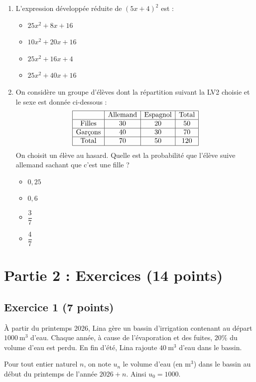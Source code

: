 \documentclass[a4paper,12pt]{article}
\begin{document}
\begin{enumerate}
\item L'expression développée réduite de \((5x+4)^2\) est :
\begin{itemize}
\item[A.] \(25x^2 + 8x + 16\)
\item[B.] \(10x^2 + 20x + 16\)
\item[C.] \(25x^2 + 16x + 4\)
\item[D.] \(25x^2 + 40x + 16\)
\end{itemize}

\item On considère un groupe d'élèves dont la répartition suivant la LV2 choisie et le sexe est donnée ci-dessous :
\[
\begin{array}{|c|c|c|c|}
\hline
& \text{Allemand} & \text{Espagnol} & \text{Total} \\
\hline
\text{Filles} & 30 & 20 & 50 \\
\hline
\text{Garçons} & 40 & 30 & 70 \\
\hline
\text{Total} & 70 & 50 & 120 \\
\hline
\end{array}
\]
On choisit un élève au hasard. Quelle est la probabilité que l'élève suive allemand sachant que c'est une fille ?
\begin{itemize}
\item[A.] \(0{,}25\)
\item[B.] \(0{,}6\)
\item[C.] \(\dfrac{3}{7}\)
\item[D.] \(\dfrac{4}{7}\)
\end{itemize}

\end{enumerate}

\section*{Partie 2 : Exercices (14 points)}

\subsection*{Exercice 1 (7 points)}
À partir du printemps 2026, Lina gère un bassin d'irrigation contenant au départ \(1000\ \mathrm{m}^3\) d'eau. Chaque année, à cause de l'évaporation et des fuites, \(20\%\) du volume d'eau est perdu. En fin d'été, Lina rajoute \(40\ \mathrm{m}^3\) d'eau dans le bassin.

Pour tout entier naturel \(n\), on note \(u_n\) le volume d'eau (en \(\mathrm{m}^3\)) dans le bassin au début du printemps de l'année \(2026+n\). Ainsi \(u_0 = 1000\).
\end{document}
